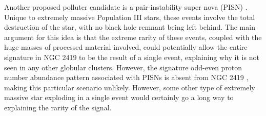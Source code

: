 \documentclass[a4paper,fleqn,usenatbib]{mnras}
\newcommand{\todo}[1]{\textcolor{red}{#1}}
\begin{document}
Another proposed  polluter candidate is a pair-instability super nova (PISN) \citep[PISN;][]{carretta2013}. Unique to extremely massive Population III stars, these events involve the total destruction of the star, with no black hole remnant being left behind. The main argument for this idea is that the extreme rarity of these events, coupled with the huge masses of processed material involved, could potentially allow the entire signature in NGC 2419 to be the result of a single event, explaining why it is not seen in any other globular clusters. However, the signature odd-even proton number abundance pattern associated with PISNs is absent from NGC 2419 \citep{cohenkirby2012}, making this particular scenario unlikely. However, some other type of extremely massive star exploding in a single event would certainly go a long way to explaining the rarity of the signal.



\end{document}
